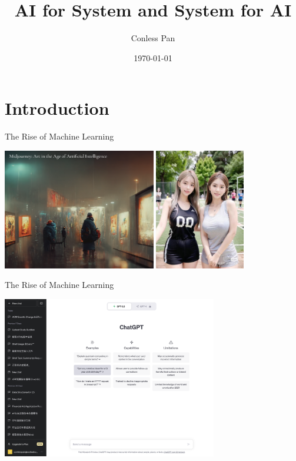 \documentclass[UTF8]{beamer}
\title{AI for System and System for AI}
\author[Conless Pan]{Conless Pan\inst{$\dagger$}}
\institute[SJTU]{
  \inst{$\dagger$}
  ACM Class 2022\\
  Shanghai Jiao Tong University
}
\date{\today}
\begin{document}
\begin{frame}[plain]
  \titlepage
\end{frame}

\begin{frame}
  \tableofcontents
\end{frame}

\section{Introduction}

\begin{frame}{The Rise of Machine Learning}
  \begin{center} 
    \includegraphics[height=150pt]{figure/midjourney_home.png} 
    \includegraphics[height=150pt]{figure/ai_pic.jpg} 
  \end{center}  
\end{frame}

\begin{frame}{The Rise of Machine Learning}
  \begin{center}
    \includegraphics[height=200pt]{figure/chatgpt.png}
  \end{center}
\end{frame}
\end{document}
